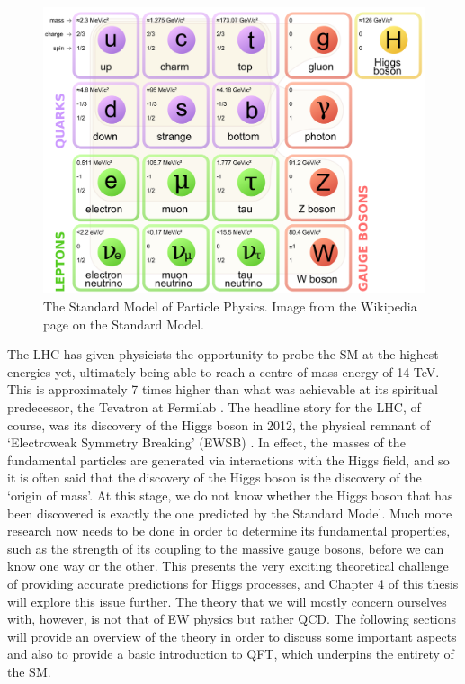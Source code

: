 \begin{figure}[t]
\centering
\includegraphics[scale=0.2]{Images/SM.png} 
\caption{The Standard Model of Particle Physics. Image from the Wikipedia page on the Standard Model.}
\label{fig:SM}
\end{figure}

The LHC has given physicists the opportunity to probe the SM at the highest energies yet, ultimately being able to reach a centre-of-mass energy of 14 TeV. This is approximately 7 times higher than what was achievable at its spiritual predecessor, the Tevatron at Fermilab \cite{Holmes2011}. The headline story for the LHC, of course, was its discovery of the Higgs boson in 2012, the physical remnant of `Electroweak Symmetry Breaking' (EWSB) \cite{Aad2012,Higgs1964}. In effect, the masses of the fundamental particles are generated via interactions with the Higgs field, and so it is often said that the discovery of the Higgs boson is the discovery of the `origin of mass'. At this stage, we do not know whether the Higgs boson that has been discovered is exactly the one predicted by the Standard Model. Much more research now needs to be done in order to determine its fundamental properties, such as the strength of its coupling to the massive gauge bosons, before we can know one way or the other. This presents the very exciting theoretical challenge of providing accurate predictions for Higgs processes, and Chapter 4 of this thesis will explore this issue further. The theory that we will mostly concern ourselves with, however, is not that of EW physics but rather QCD. The following sections will provide an overview of the theory in order to discuss some important aspects and also to provide a basic introduction to QFT, which underpins the entirety of the SM. 

